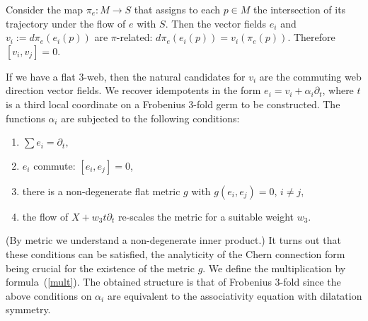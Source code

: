 Consider the map $\pi_e: M\to S$ that assigns to each $p\in M$ the intersection
of its trajectory under the f\/low of $e$ with $S$.
Then the vector f\/ields $e_i$ and $v_i:=d\pi_e(e_i(p))$ are $\pi$-related: $d\pi_e(e_i(p))=v_i(\pi_e(p))$.
Therefore $[v_i,v_j]=0$.

If we have a f\/lat $3$-web, then the natural candidates for $v_i$ are the commuting web direction vector f\/ields. We recover idempotents in the form $e_i=v_i+\alpha_i\partial_t$, where $t$ is a third local coordinate on a Frobenius $3$-fold germ to be constructed.
The functions $\alpha_i$ are subjected to the following conditions:
\begin{enumerate}\itemsep=0pt
\item[1)] $\sum e_i=\partial_t,$
\item[2)] $e_i$ commute: $[e_i,e_j]=0$,
\item[3)] there is a non-degenerate f\/lat metric $g$ with $g(e_i,e_j)=0$, $i\ne j$,
\item[4)] the f\/low of $X+w_3t\partial_t$ re-scales the metric for a suitable weight $w_3$.
\end{enumerate}
(By metric we understand a non-degenerate inner product.)
It turns out that these conditions can be satisf\/ied, the analyticity of the Chern connection form being crucial for the existence of the metric $g$.
We def\/ine the multiplication by formula~(\ref{mult}). The obtained structure is that of Frobenius $3$-fold since the above conditions on $\alpha_i$ are equivalent to the associativity equation with dilatation symmetry.

